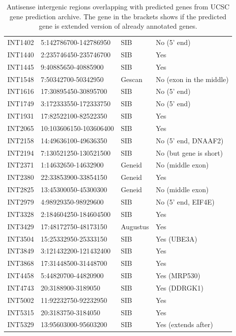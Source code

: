 \begin{table}[h]
\begin{tabular}{llll}
	INT1402 & 5:142786700-142786950 & SIB & No (5' end) \\
	INT1440 & 2:235746450-235746700 & SIB & Yes \\
	INT1445 & 9:40885650-40885900 & SIB & Yes \\
	INT1548 & 7:50342700-50342950 & Gescan & No (exon in the middle) \\
	INT1616 & 17:30895450-30895700 & SIB & No (5' end) \\
	INT1749 & 3:172333550-172333750 & SIB & No (5' end) \\
	INT1931 & 17:82522100-82522350 & SIB & Yes \\
	INT2065 & 10:103606150-103606400 & SIB & Yes \\
	INT2158 & 14:49636100-49636350 & SIB & No (5' end, DNAAF2) \\
	INT2194 & 7:130521250-130521500 & SIB & No (but gene is short) \\
	INT2371 & 1:14632650-14632900 & Geneid & No (middle exon) \\
	INT2380 & 22:33853900-33854150 & Geneid & Yes \\
	INT2825 & 13:45300050-45300300 & Geneid & No (middle exon) \\
	INT2979 & 4:98929350-98929600 & SIB & No (5' end, EIF4E) \\
	INT3328 & 2:184604250-184604500 & SIB & Yes \\
	INT3429 & 17:48172750-48173150 & Augustus & Yes \\
	INT3504 & 15:25332950-25333150 & SIB & Yes (UBE3A) \\
	INT3849 & 3:121432200-121432400 & SIB & Yes \\
	INT3868 & 17:31448500-31448700 & SIB & Yes \\
	INT4458 & 5:44820700-44820900 & SIB & Yes (MRP530) \\
	INT4743 & 20:3188900-3189050 & SIB & Yes (DDRGK1) \\
	INT5002 & 11:92232750-92232950 & SIB & Yes \\
	INT5315 & 20:3183750-3184050 & SIB & Yes \\
	INT5329 & 13:95603000-95603200 & SIB & Yes (extends after) \\
        \bottomrule
    \end{tabular}
    \caption{Antisense intergenic regions overlapping with predicted genes from UCSC gene prediction archive.
    The gene in the brackets shows if the predicted gene is extended version of already annotated genes.}
    \label{tab:predictionsAntisense}
\end{table}

